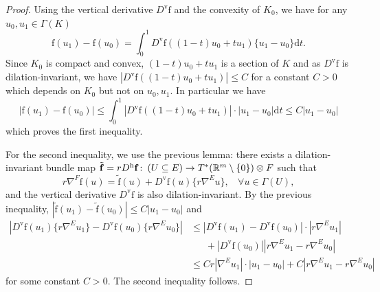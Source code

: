 \documentclass{article}
\numberwithin{equation}{section}        %
\theoremstyle{bfnote}
\theoremstyle{definition}
\theoremstyle{bfremark}
\newcommand{\col}{\colon \thinspace}        %
\newcommand{\R}{\mathbb{R}}                 %
\newcommand{\diff}{\mathrm{d}}                      %
\newcommand{\bmap}[1]{\boldsymbol{\mathrm{#1}}}     %
\begin{document}
\begin{proof}
	Using the vertical derivative $D^{\mathrm{v}} \bmap{f}$ and the convexity of $K_0$, we have for any $u_0,u_1 \in \Gamma(K)$
    \begin{equation*}
        \bmap{f}(u_1)-\bmap{f}(u_0) = \int_0^1 D^{\mathrm{v}} \bmap{f}((1-t)u_0+tu_1)\{u_1-u_0\} \diff t .
    \end{equation*}
    Since $K_0$ is compact and convex, $(1-t)u_0+tu_1$ is a section of $K$ and as $D^{\mathrm{v}} \bmap{f}$ is dilation-invariant, we have $|D^{\mathrm{v}} \bmap{f}((1-t)u_0+tu_1)| \leq C$ for a constant $C > 0$ which depends on $K_0$ but not on $u_0,u_1$. In particular we have
    \begin{equation*}
        |\bmap{f}(u_1) - \bmap{f}(u_0)| \leq \int_0^1 |D^{\mathrm{v}} \bmap{f}((1-t)u_0+tu_1)| \cdot |u_1-u_0| \diff t \leq C |u_1-u_0|
    \end{equation*}
    which proves the first inequality.

    For the second inequality, we use the previous lemma: there exists a dilation-invariant bundle map $\tilde{\bmap{f}} = r D^{\mathrm{h}} \bmap{f} \col (U \subseteq E) \to T^*(\R^{m} \setminus \{0\}) \otimes F$ such that
    \begin{equation*}
        r\nabla^F \bmap{f}(u) = \tilde{\bmap{f}}(u) + D^{\mathrm{v}} \bmap{f}(u) \{ r\nabla^E u \}, ~~~~ \forall u \in \Gamma(U),
    \end{equation*}
    and the vertical derivative $D^{\mathrm{v}} \bmap{f}$ is also dilation-invariant. By the previous inequality, $|\tilde{\bmap{f}}(u_1) - \tilde{\bmap{f}}(u_0)| \leq C |u_1-u_0|$ and 
    \begin{align*}
    	|D^{\mathrm{v}} \bmap{f}(u_1) \{ r\nabla^E u_1\} - D^{\mathrm{v}} \bmap{f} (u_0) \{ r \nabla^E u_0\} | & \leq |D^{\mathrm{v}} \bmap{f}(u_1) - D^{\mathrm{v}} \bmap{f}(u_0)| \cdot |r \nabla^E u_1| \\
		& ~~~~~~~ + |D^{\mathrm{v}} \bmap{f}(u_0)| |r\nabla^E u_1 - r\nabla^E u_0| \\
		& \leq C r |\nabla^E u_1| \cdot |u_1-u_0| + C |r \nabla^E u_1 - r \nabla^E u_0|
    \end{align*}
    for some constant $C > 0$. The second inequality follows.
    

\end{proof}
\end{document}
